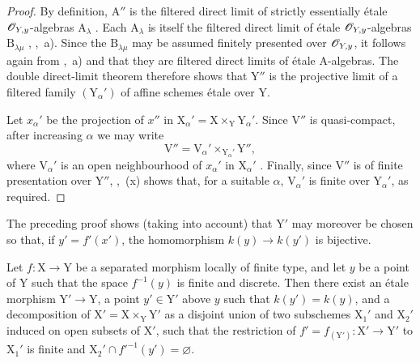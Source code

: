 \begin{proof}
By definition, $\mathrm{A}''$ is the filtered direct limit of strictly essentially \'etale $\mathscr{O}_{Y,y}$-algebras $\mathrm{A}_\lambda$ . Each $\mathrm{A}_\lambda$ is itself the filtered direct limit of \'etale $\mathscr{O}_{Y,y}$-algebras $\mathrm{B}_{\lambda\mu}$ , ,~a). Since the $\mathrm{B}_{\lambda\mu}$ may be assumed finitely presented over $\mathscr{O}_{Y,y}$, it follows again from ,~a) and  that they are filtered direct limits of \'etale $\mathrm{A}$-algebras. The double direct-limit theorem therefore shows that $\mathrm{Y}''$ is the projective limit of a filtered family $(\mathrm{Y}_\alpha')$ of affine schemes \'etale over $\mathrm{Y}$.

Let $x_\alpha'$ be the projection of $x''$ in $\mathrm{X}_\alpha'=\mathrm{X}\times_{\mathrm{Y}}\mathrm{Y}_\alpha'$. Since $\mathrm{V}''$ is quasi-compact, after increasing $\alpha$ we may write
\[
  \mathrm{V}''=\mathrm{V}_\alpha'\times_{\mathrm{Y}_\alpha'}\mathrm{Y}'',
\]
where $\mathrm{V}_\alpha'$ is an open neighbourhood of $x_\alpha'$ in $\mathrm{X}_\alpha'$ . Finally, since $\mathrm{V}''$ is of finite presentation over $\mathrm{Y}''$, ,~(x) shows that, for a suitable $\alpha$, $\mathrm{V}_\alpha'$ is finite over $\mathrm{Y}_\alpha'$, as required.
\end{proof}

\begin{remark}[18.12.2]
\label{IV.18.12.2}
The preceding proof shows (taking  into account) that $\mathrm{Y}'$ may moreover be chosen so that, if $y'=f'(x')$, the homomorphism $k(y)\to k(y')$ is bijective.
\end{remark}

\begin{corollary}[18.12.3]
\label{IV.18.12.3}
Let $f:\mathrm{X}\to\mathrm{Y}$ be a separated morphism locally of finite type, and let $y$ be a point of $\mathrm{Y}$ such that the space $f^{-1}(y)$ is finite and discrete.
Then there exist an \'etale morphism $\mathrm{Y}'\to\mathrm{Y}$, a point $y'\in\mathrm{Y}'$ above $y$ such that $k(y')=k(y)$, and a decomposition of $\mathrm{X}'=\mathrm{X}\times_{\mathrm{Y}}\mathrm{Y}'$ as a disjoint union of two subschemes $\mathrm{X}_1'$ and $\mathrm{X}_2'$ induced on open subsets of $\mathrm{X}'$, such that the restriction of $f'=f_{(\mathrm{Y}')}:\mathrm{X}'\to\mathrm{Y}'$ to $\mathrm{X}_1'$ is finite and $\mathrm{X}_2'\cap f'^{-1}(y')=\varnothing$.
\end{corollary}

